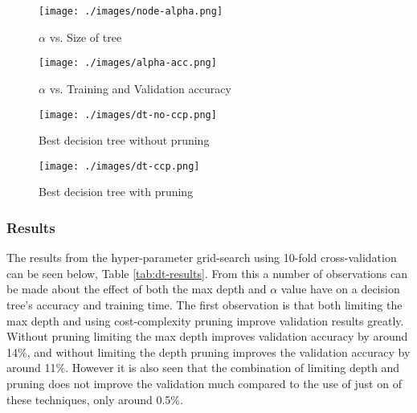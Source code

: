 \documentclass[12pt,a4paper,titlepage,twoside]{report}
\begin{document}
	\begin{minipage}[t]{\textwidth}
	\begin{minipage}{0.5\textwidth}
		\centering
		\begin{figure}[H]
	  		\centering
  			\texttt{[image: ./images/node-alpha.png]}
  			\caption{$\alpha$ vs. Size of tree}
  			\label{fig:alpha-nodes-depth}
		\end{figure}
	\end{minipage}%
	\hspace{0.5cm}%
	\begin{minipage}{0.5\textwidth}
		\begin{figure}[H]
  			\centering
	  		\texttt{[image: ./images/alpha-acc.png]}
  			\caption{$\alpha$ vs. Training and Validation accuracy}
 			\label{fig:alpha-accuracy}
		\end{figure}
	\end{minipage}%
	\hspace{0.5cm}
	\end{minipage}
	
	\begin{figure}[h]
		\centering
  		\texttt{[image: ./images/dt-no-ccp.png]}
  		\caption{Best decision tree without pruning}
  		\label{fig:dt-no-ccp}
	\end{figure}
	
	\begin{figure}[h]
		\centering
  		\texttt{[image: ./images/dt-ccp.png]}
  		\caption{Best decision tree with pruning}
  		\label{fig:dt-ccp}
	\end{figure}
	
\subsubsection*{Results}
	The results from the hyper-parameter grid-search using 10-fold cross-validation can be seen below, Table \ref{tab:dt-results}. From this a number of observations can be made about the effect of both the max depth and $\alpha$ value have on a decision tree's accuracy and training time. The first observation is that both limiting the max depth and using cost-complexity pruning improve validation results greatly. Without pruning limiting the max depth improves validation accuracy by around 14\%, and without limiting the depth pruning improves the validation accuracy by around 11\%. However it is also seen that the combination of limiting depth and pruning does not improve the validation much compared to the use of just on of these techniques, only around 0.5\%. 
	
\end{document}
